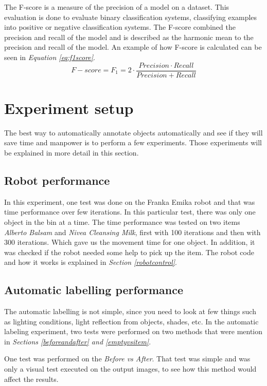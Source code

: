 The F-score is a measure of the precision of a model on a dataset. This evaluation is done to evaluate binary classification systems, classifying examples into positive or negative classification systems. 
The F-score combined the precision and recall of the model and is described as the harmonic mean to the precision and recall of the model\cite{wood_f-score_2019}.
An example of how F-score is calculated can be seen in \textit{Equation \ref{eq:f1score}}.
\begin{equation}
    F- score = F_1 = 2 \cdot \frac{Precision \cdot Recall}{Precision + Recall}
    \label{eq:f1score}
\end{equation}


\section{Experiment setup}
The best way to automatically annotate objects automatically and see if they will save time and manpower is to perform a few experiments. Those experiments will be explained in more detail in this section.

\subsection{Robot performance}
In this experiment, one test was done on the Franka Emika robot and that was time performance over few iterations. In this particular test, there was only one object in the bin at a time. The time performance was tested on two items \textit{Alberto Balsam} and \textit{Nivea Cleansing Milk}, first with 100 iterations and then with 300 iterations. Which gave us the movement time for one object. In addition, it was checked if the robot needed some help to pick up the item. The robot code and how it works is explained in \textit{Section \ref{robotcontrol}}. 

\subsection{Automatic labelling performance}
The automatic labelling is not simple, since you need to look at few things such as lighting conditions, light reflection from objects, shades, etc. 
In the automatic labeling experiment, two tests were performed on two methods that were mention in \textit{Sections \ref{beforeandafter} and \ref{emptyvsitem}}. 

One test was performed on the \textit{Before vs After}. That test was simple and was only a visual test executed on the output images, to see how this method would affect the results.

